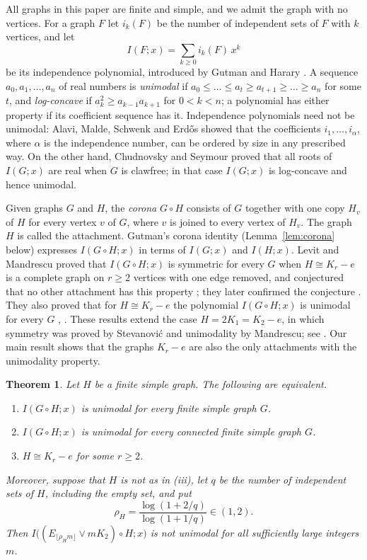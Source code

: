 \documentclass[11pt]{amsart}
\newtheorem{theorem}{Theorem}[section]
\theoremstyle{remark}
\numberwithin{equation}{section}
\newcommand{\cor}{\circ}
\begin{document}
All graphs in this paper are finite and simple, and we admit the graph with no vertices. For a graph $F$ let $i_k(F)$ be the number of independent sets of $F$ with $k$ vertices, and let
\[
I(F;x)=\sum_{k\ge 0} i_k(F)\,x^k
\]
be its independence polynomial, introduced by Gutman and Harary \cite{GH83}. A sequence $a_0,a_1,\dots,a_n$ of real numbers is \emph{unimodal} if $a_0\le\dots\le a_t\ge a_{t+1}\ge\dots\ge a_n$ for some $t$, and \emph{log-concave} if $a_k^2\ge a_{k-1}a_{k+1}$ for $0<k<n$; a polynomial has either property if its coefficient sequence has it. Independence polynomials need not be unimodal: Alavi, Malde, Schwenk and Erd\H{o}s \cite{AMSE87} showed that the coefficients $i_1,\dots,i_{\alpha}$, where $\alpha$ is the independence number, can be ordered by size in any prescribed way. On the other hand, Chudnovsky and Seymour \cite{CS07} proved that all roots of $I(G;x)$ are real when $G$ is clawfree; in that case $I(G;x)$ is log-concave and hence unimodal.

Given graphs $G$ and $H$, the \emph{corona} $G\cor H$ \cite{FH70} consists of $G$ together with one copy $H_v$ of $H$ for every vertex $v$ of $G$, where $v$ is joined to every vertex of $H_v$. The graph $H$ is called the attachment. Gutman's corona identity (Lemma~\ref{lem:corona} below) expresses $I(G\cor H;x)$ in terms of $I(G;x)$ and $I(H;x)$. Levit and Mandrescu \cite{LM13} proved that $I(G\cor H;x)$ is symmetric for every $G$ when $H\cong K_r-e$ is a complete graph on $r\ge 2$ vertices with one edge removed, and conjectured that no other attachment has this property \cite[Conjecture~3.1]{LM13}; they later confirmed the conjecture \cite[Theorem~4.5]{LM16}. They also proved that for $H\cong K_r-e$ the polynomial $I(G\cor H;x)$ is unimodal for every $G$ \cite[Theorem~2.9]{LM13}, \cite[Theorem~4.3]{LM16}. These results extend the case $H=2K_1=K_2-e$, in which symmetry was proved by Stevanovi\'c and unimodality by Mandrescu; see \cite{LM13}. Our main result shows that the graphs $K_r-e$ are also the only attachments with the unimodality property.

\begin{theorem}\label{thm:main}
Let $H$ be a finite simple graph. The following are equivalent.
\begin{enumerate}
\item[(i)] $I(G\cor H;x)$ is unimodal for every finite simple graph $G$.
\item[(ii)] $I(G\cor H;x)$ is unimodal for every connected finite simple graph $G$.
\item[(iii)] $H\cong K_r-e$ for some $r\ge 2$.
\end{enumerate}
Moreover, suppose that $H$ is not as in (iii), let $q$ be the number of independent sets of $H$, including the empty set, and put
\[
\rho_H=\frac{\log(1+2/q)}{\log(1+1/q)}\in(1,2).
\]
Then $I\bigl((E_{\lfloor\rho_H m\rfloor}\vee mK_2)\cor H;x\bigr)$ is not unimodal for all sufficiently large integers $m$.
\end{theorem}
\end{document}
